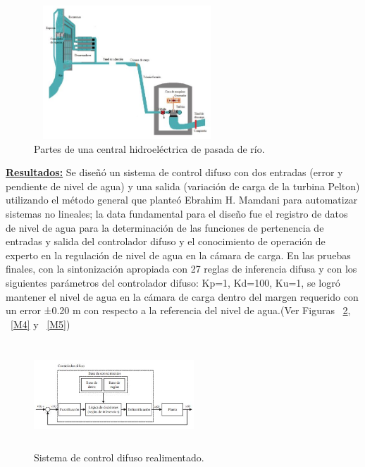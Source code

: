 \documentclass[10pt,conference]{IEEEtran}
\begin{document}
\begin{enumerate}
     \begin{figure}[H]
    \begin{center}
    \includegraphics[width=7cm,height=5cm]{figuras/M2.JPG}
    \caption{Partes de una central hidroeléctrica de pasada de río.}
    \label{M2} 
    \end{center}
    \end{figure}

\textbf{\underline{Resultados:}} 
Se diseñó un sistema de control difuso con dos entradas (error y pendiente de nivel de agua) y una salida (variación de carga de la turbina Pelton) utilizando el método general que planteó Ebrahim H. Mamdani para automatizar sistemas no lineales; la data fundamental para el diseño fue el registro de datos de nivel de agua para la determinación de las funciones de pertenencia de entradas y salida del controlador difuso y el conocimiento de operación de experto en la regulación de nivel de agua en la cámara de carga. En las pruebas finales, con la sintonización apropiada con 27 reglas de inferencia difusa y con los siguientes parámetros del controlador difuso: Kp=1, Kd=100, Ku=1, se logró mantener el nivel de agua en la cámara de carga dentro del margen requerido con un error ±0.20 m con respecto a la referencia del nivel de agua.(Ver Figuras ~\ref{M3}, ~\ref{M4} y ~\ref{M5})

    \begin{figure}[H]
    \begin{center}
    \includegraphics[width=6cm,height=4cm]{figuras/M3.JPG}
    \caption{ Sistema de control difuso realimentado.}
    \label{M3} 
    \end{center}
    \end{figure}


\end{enumerate}
\end{document}
